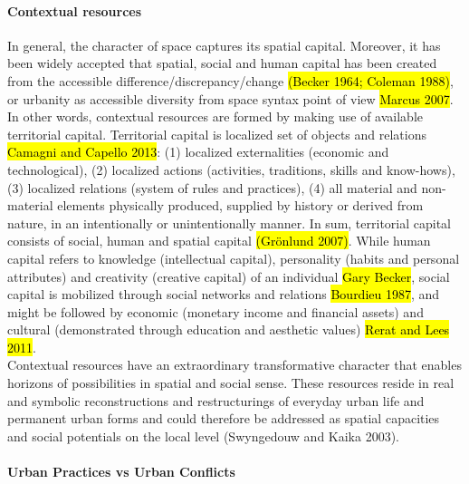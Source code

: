 \documentclass[11pt]{report}
\begin{document}
\paragraph{Contextual resources}

In general, the character of space captures its spatial capital. 
Moreover, it has been widely accepted that spatial, social and human capital has been created from the accessible difference/discrepancy/change \hl{(Becker 1964; Coleman 1988)}, or urbanity as accessible diversity from space syntax point of view \hl{Marcus 2007}. In other words, contextual resources are formed by making use of available territorial capital.
Territorial capital is localized set of objects and relations \hl{Camagni and Capello 2013}: (1) localized externalities (economic and technological), (2) localized actions (activities, traditions, skills and know-hows), (3) localized relations (system of rules and practices), (4) all material and non-material elements physically produced, supplied by history or derived from nature, in an intentionally or unintentionally manner.
In sum, territorial capital consists of social, human and spatial capital \hl{(Grönlund 2007)}. While human capital refers to knowledge (intellectual capital), personality (habits and personal attributes) and creativity (creative capital) of an individual \hl{Gary Becker}, social capital is mobilized through social networks and relations \hl{Bourdieu 1987}, and might be followed by economic (monetary income and  financial  assets) and cultural (demonstrated through education and aesthetic values) \hl{Rerat and Lees 2011}.
\\
Contextual resources have an extraordinary transformative character that enables horizons of possibilities in spatial and social sense.
These resources reside in real and symbolic reconstructions and restructurings of everyday urban life and permanent urban forms and could therefore be addressed as spatial capacities and social potentials on the local level (Swyngedouw and Kaika 2003).

\paragraph{Urban Practices vs Urban Conflicts}
\end{document}
